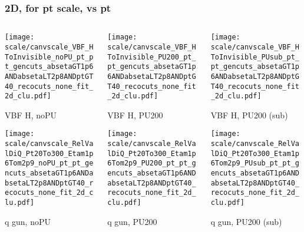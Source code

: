 \documentclass[8pt]{beamer}
\begin{document}
 \begin{frame}
  \frametitle{2D, for pt scale, vs pt}
  
  \begin{columns}
   \begin{column}{0.35\textwidth}
     \texttt{[image: scale/canvscale\_VBF\_HToInvisible\_noPU\_pt\_pt\_gencuts\_absetaGT1p6ANDabsetaLT2p8ANDptGT40\_recocuts\_none\_fit\_2d\_clu.pdf]}
     
     VBF H, noPU
    
     \texttt{[image: scale/canvscale\_RelValDiQ\_Pt20To300\_Etam1p6Tom2p9\_noPU\_pt\_pt\_gencuts\_absetaGT1p6ANDabsetaLT2p8ANDptGT40\_recocuts\_none\_fit\_2d\_clu.pdf]}
     
     q gun, noPU
   \end{column}
   \begin{column}{0.35\textwidth}
     \texttt{[image: scale/canvscale\_VBF\_HToInvisible\_PU200\_pt\_pt\_gencuts\_absetaGT1p6ANDabsetaLT2p8ANDptGT40\_recocuts\_none\_fit\_2d\_clu.pdf]}
     
     VBF H, PU200
    
     \texttt{[image: scale/canvscale\_RelValDiQ\_Pt20To300\_Etam1p6Tom2p9\_PU200\_pt\_pt\_gencuts\_absetaGT1p6ANDabsetaLT2p8ANDptGT40\_recocuts\_none\_fit\_2d\_clu.pdf]}
     
     q gun, PU200
   \end{column}
   \begin{column}{0.35\textwidth}
     \texttt{[image: scale/canvscale\_VBF\_HToInvisible\_PUsub\_pt\_pt\_gencuts\_absetaGT1p6ANDabsetaLT2p8ANDptGT40\_recocuts\_none\_fit\_2d\_clu.pdf]}
     
     VBF H, PU200 (sub)
    
     \texttt{[image: scale/canvscale\_RelValDiQ\_Pt20To300\_Etam1p6Tom2p9\_PUsub\_pt\_pt\_gencuts\_absetaGT1p6ANDabsetaLT2p8ANDptGT40\_recocuts\_none\_fit\_2d\_clu.pdf]}
     
     q gun, PU200 (sub)
   \end{column}
  \end{columns}
 \end{frame}
\end{document}
